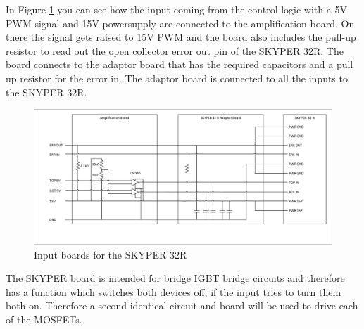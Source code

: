 In Figure \ref{fig:Skyper32in} you can see how the input coming from the control logic with a 5V PWM signal and 15V powersupply are connected to the amplification board.
On there the signal gets raised to 15V PWM and the board also includes the pull-up resistor to read out the open collector error out pin of the SKYPER 32R. The board connects to the adaptor board that has the required capacitors and a pull up resistor for the error in. The adaptor board is connected to all the inputs to the SKYPER 32R.

\begin{figure}[H]
   \centering
   \includegraphics[width=\textwidth]{figures/Skyperboard/Skyper32in.pdf}
    \caption{Input boards for the SKYPER 32R}
	\label{fig:Skyper32in}
\end{figure}
The SKYPER board is intended for bridge IGBT bridge circuits and therefore has a function which switches both devices off, if the input tries to turn them both on.\cite{SKYPER322:online} Therefore a second identical circuit and board will be used to drive each of the MOSFETs.

\clearpage